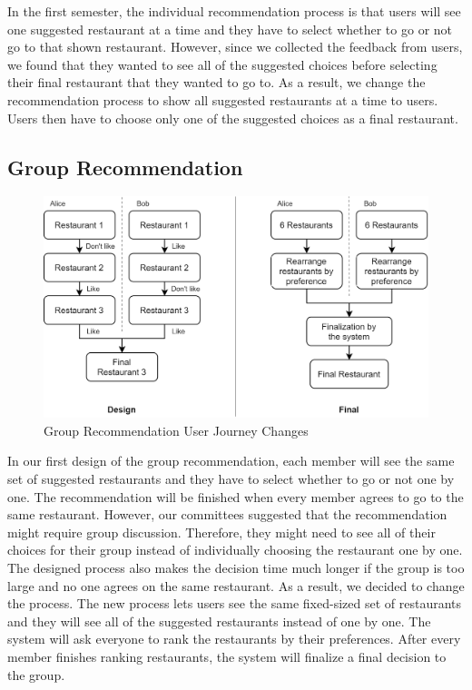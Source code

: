\documentclass[12pt,oneside,openright,a4paper]{cpe-english-project}
\begin{document}
In the first semester, the individual recommendation process is that users will see one suggested restaurant at a time and they have to select whether to go or not go to that shown restaurant. However, since we collected the feedback from users, we found that they wanted to see all of the suggested choices before selecting their final restaurant that they wanted to go to. As a result, we change the recommendation process to show all suggested restaurants at a time to users. Users then have to choose only one of the suggested choices as a final restaurant.

\subsection{Group Recommendation}

\begin{figure}[H]\centering
\includegraphics[width=350pt]{./images/4GroupRecommendationUserJourneyChanges.png}
\caption{Group Recommendation User Journey Changes}\label{fig:4GroupRecommendationUserJourneyChanges}
\end{figure}\vspace{-24pt}

In our first design of the group recommendation, each member will see the same set of suggested restaurants and they have to select whether to go or not one by one. The recommendation will be finished when every member agrees to go to the same restaurant. However, our committees suggested that the recommendation might require group discussion. Therefore, they might need to see all of their choices for their group instead of individually choosing the restaurant one by one. The designed process also makes the decision time much longer if the group is too large and no one agrees on the same restaurant. As a result, we decided to change the process. The new process lets users see the same fixed-sized set of restaurants and they will see all of the suggested restaurants instead of one by one. The system will ask everyone to rank the restaurants by their preferences. After every member finishes ranking restaurants, the system will finalize a final decision to the group.
\end{document}
